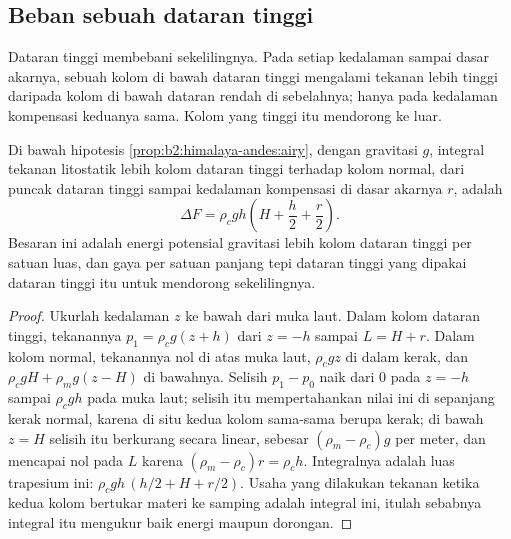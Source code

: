 \subsection{Beban sebuah dataran tinggi}

Dataran tinggi membebani sekelilingnya. Pada setiap kedalaman sampai dasar akarnya, sebuah kolom
di bawah dataran tinggi mengalami tekanan lebih tinggi daripada kolom di bawah dataran rendah di sebelahnya;
hanya pada kedalaman kompensasi keduanya sama. Kolom yang tinggi itu mendorong ke luar.

\begin{proposition}\label{prop:b2:himalaya-andes:gpe}
Di bawah hipotesis \cref{prop:b2:himalaya-andes:airy}, dengan gravitasi $g$, integral
tekanan litostatik lebih kolom dataran tinggi terhadap kolom normal, dari puncak
dataran tinggi sampai kedalaman kompensasi di dasar akarnya $r$, adalah
\[
  \Delta F = \rho_c g h \left(H + \frac{h}{2} + \frac{r}{2}\right) .
\]
Besaran ini adalah energi potensial gravitasi lebih kolom dataran tinggi per satuan luas, dan
gaya per satuan panjang tepi dataran tinggi yang dipakai dataran tinggi itu untuk mendorong
sekelilingnya.
\end{proposition}

\begin{proof}
Ukurlah kedalaman $z$ ke bawah dari muka laut. Dalam kolom dataran tinggi, tekanannya $p_1 =
\rho_c g (z + h)$ dari $z = -h$ sampai $L = H + r$. Dalam kolom normal, tekanannya nol di atas muka
laut, $\rho_c g z$ di dalam kerak, dan $\rho_c g H + \rho_m g (z - H)$ di bawahnya. Selisih $p_1
- p_0$ naik dari 0 pada $z = -h$ sampai $\rho_c g h$ pada muka laut; selisih itu mempertahankan nilai ini di sepanjang
kerak normal, karena di situ kedua kolom sama-sama berupa kerak; di bawah $z = H$ selisih itu berkurang secara linear, sebesar
$(\rho_m - \rho_c) g$ per meter, dan mencapai nol pada $L$ karena $(\rho_m - \rho_c) r = \rho_c
h$. Integralnya adalah luas trapesium ini: $\rho_c g h\,(h/2 + H + r/2)$. Usaha yang dilakukan
tekanan ketika kedua kolom bertukar materi ke samping adalah integral ini, itulah sebabnya integral itu
mengukur baik energi maupun dorongan.
\end{proof}

